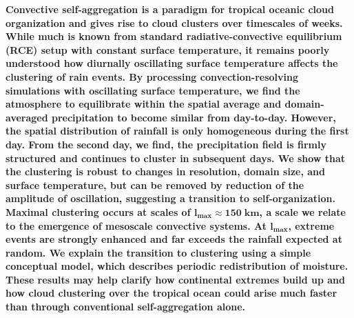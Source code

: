 \documentclass[draft,linenumbers]{agujournal2019}
\begin{document}
\noindent
{\bf
Convective self-aggregation is a paradigm for tropical oceanic cloud organization and gives rise to cloud clusters over timescales of weeks. While much is known from standard radiative-convective equilibrium (RCE) setup with constant surface temperature, it remains poorly understood how diurnally oscillating surface temperature affects the clustering of rain events. 
By processing convection-resolving simulations with oscillating surface temperature, we find the atmosphere to equilibrate within the spatial average and domain-averaged precipitation to become similar from day-to-day. 
However, the spatial distribution of rainfall is only homogeneous during the first day. 
From the second day, we find, the precipitation field is firmly structured and continues to cluster in subsequent days.
We show that the clustering is robust to changes in resolution, domain size, and surface temperature, but can be removed by reduction of the amplitude of oscillation, suggesting a transition to self-organization. Maximal clustering occurs at scales of $\mathbf{l_{max}\approx 150\;km}$, a scale we relate to the emergence of mesoscale convective systems. 
At $\mathbf{l_{max}}$, extreme events are strongly enhanced and far exceeds the rainfall expected at random. 
We explain the transition to clustering using a simple conceptual model, which describes periodic redistribution of moisture. 
These results may help clarify how continental extremes build up and how cloud clustering over the tropical ocean could arise much faster than through conventional self-aggregation alone.
}
\end{document}
